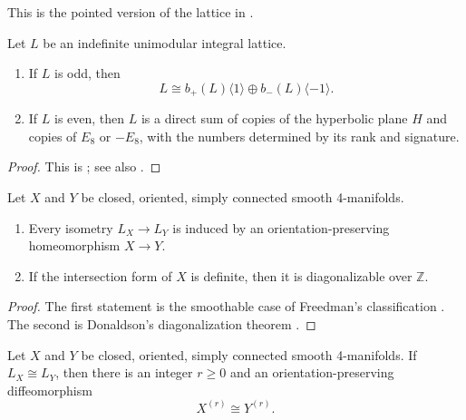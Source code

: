 \begin{remark}
\label{rem:pointed-lattice-convention}
This is the pointed version of the lattice in
\cite[Definition~1.2.1]{GompfStipsicz1999}.
\end{remark}

\begin{theorem}
\label{thm:indefinite-unimodular-forms}
Let $L$ be an indefinite unimodular integral lattice.
\begin{enumerate}[label=(\roman*),ref=\roman*]
  \item If $L$ is odd, then
  \[
    L\cong b_+(L)\langle 1\rangle
      \oplus b_-(L)\langle-1\rangle.
  \]
  \item If $L$ is even, then $L$ is a direct sum of copies of the
  hyperbolic plane $H$ and copies of $E_8$ or $-E_8$, with the numbers
  determined by its rank and signature.
\end{enumerate}
\end{theorem}

\begin{proof}
This is \cite[Theorem~1.2.21]{GompfStipsicz1999}; see also
\cite[Theorem~2.3.1]{PetersSterk2024}.
\end{proof}

\begin{theorem}
\label{thm:freedman-donaldson}
Let \(X\) and \(Y\) be closed, oriented, simply connected smooth
4-manifolds.
\begin{enumerate}[label=(\roman*),ref=\roman*]
  \item Every isometry \(L_X\to L_Y\) is induced by an
  orientation-preserving homeomorphism \(X\to Y\).
  \item If the intersection form of \(X\) is definite, then it is diagonalizable
  over $\mathbb Z$.
\end{enumerate}
\end{theorem}

\begin{proof}
The first statement is the smoothable case of Freedman's classification
\cite[Theorem~1.2.27]{GompfStipsicz1999,Freedman1982}.  The second is
Donaldson's diagonalization theorem
\cite[Theorem~1.2.30]{GompfStipsicz1999,Donaldson1983}.
\end{proof}

\begin{theorem}
\label{thm:wall-stable-classification}
Let $X$ and $Y$ be closed, oriented, simply connected smooth
4-manifolds.  If $L_X\cong L_Y$, then there is an integer $r\geq 0$ and
an orientation-preserving diffeomorphism
\[
  X^{(r)}\cong Y^{(r)}.
\]
\end{theorem}

